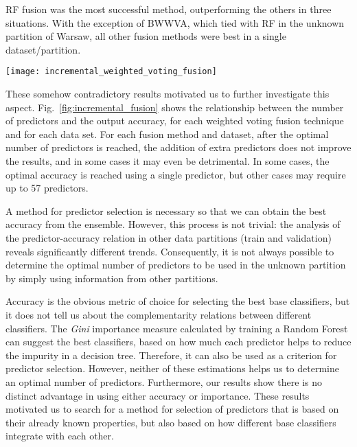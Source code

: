 RF fusion was the most successful method, outperforming the others in three situations. 
With the exception of BWWVA, which tied with RF in the unknown partition of Warsaw, all other fusion methods were best in a single dataset/partition.
%
\begin{figure*}[b]
    \centering
    \texttt{[image: incremental\_weighted\_voting\_fusion]}
    \caption{Relationship between classification accuracy and number of predictors used in the fusion. The top row shows results for \textit{BWWVA}, and the bottom row for \textit{BWWVI}.}
    \label{fig:incremental_fusion}
\end{figure*}

These somehow contradictory results motivated us to further investigate this aspect.  Fig.~\ref{fig:incremental_fusion} shows the relationship between the number of predictors and the output accuracy, for each weighted voting fusion technique and for each data set. 
For each fusion method and dataset, after the optimal number of predictors is reached, the addition of extra predictors does not improve the results, and in some cases it may even be detrimental.
In some cases, the optimal accuracy is reached using a single predictor, but other cases may require up to 57 predictors. 

A method for predictor selection is necessary so that we can obtain the best accuracy from the ensemble.
However, this process is not trivial: the analysis of the predictor-accuracy relation in other data partitions (train and validation) reveals significantly different trends. Consequently, it is not always possible to determine the optimal number of predictors to be used in the unknown partition by simply using information from other partitions.

Accuracy is the obvious metric of choice for selecting the best base classifiers, but it does not tell us about the complementarity relations between different classifiers. The \textit{Gini} importance measure calculated by training a Random Forest can suggest the best classifiers, based on how much each predictor helps to reduce the impurity in a decision tree. Therefore, it can also be used as a criterion for predictor selection. However, neither of these estimations helps us to determine an optimal number of predictors. Furthermore, our results show there is no distinct advantage in using either accuracy or importance. These results motivated us to search for a method for selection of predictors that is based on their already known properties, but also based on how different base classifiers integrate with each other. 



